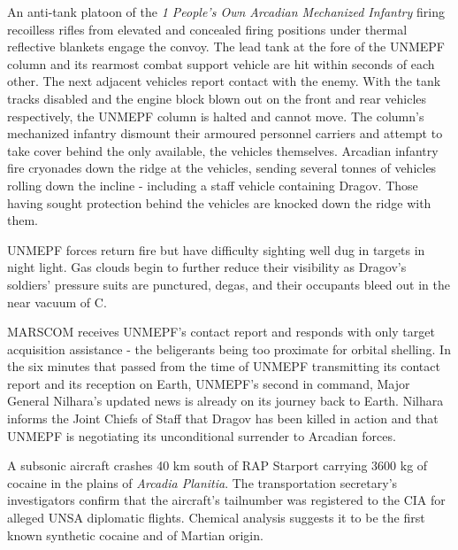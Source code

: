 An anti-tank platoon of the {\it 1 People's Own Arcadian Mechanized Infantry} firing recoilless rifles from elevated and concealed firing positions under thermal reflective blankets engage the convoy. The lead tank at the fore of the UNMEPF column and its rearmost combat support vehicle are hit within seconds of each other. The next adjacent vehicles report contact with the enemy. With the tank tracks disabled and the engine block blown out on the front and rear vehicles respectively, the UNMEPF column is halted and cannot move. The column's mechanized infantry dismount their armoured personnel carriers and attempt to take cover behind the only available, the vehicles themselves. Arcadian infantry fire cryonades down the ridge at the vehicles, sending several tonnes of vehicles rolling down the incline - including a staff vehicle containing Dragov. Those having sought protection behind the vehicles are knocked down the ridge with them. 

UNMEPF forces return fire but have difficulty sighting well dug in targets in night light. Gas clouds begin to further reduce their visibility as Dragov's soldiers' pressure suits are punctured, degas, and their occupants bleed out in the near vacuum of C.

MARSCOM receives UNMEPF's contact report and responds with only target acquisition assistance - the beligerants being too proximate for orbital shelling. In the six minutes that passed from the time of UNMEPF transmitting its contact report and its reception on Earth, UNMEPF's second in command, Major General Nilhara's updated news is already on its journey back to Earth. Nilhara informs the Joint Chiefs of Staff that Dragov has been killed in action and that UNMEPF is negotiating its unconditional surrender to Arcadian forces.
\StopTimelineDate

A subsonic aircraft crashes 40 km south of RAP Starport carrying 3600 kg of cocaine in the plains of {\it Arcadia Planitia}. The transportation secretary's investigators confirm that the aircraft's tailnumber was registered to the CIA for alleged UNSA diplomatic flights. Chemical analysis suggests it to be the first known synthetic cocaine and of Martian origin.
\StopTimelineDate






